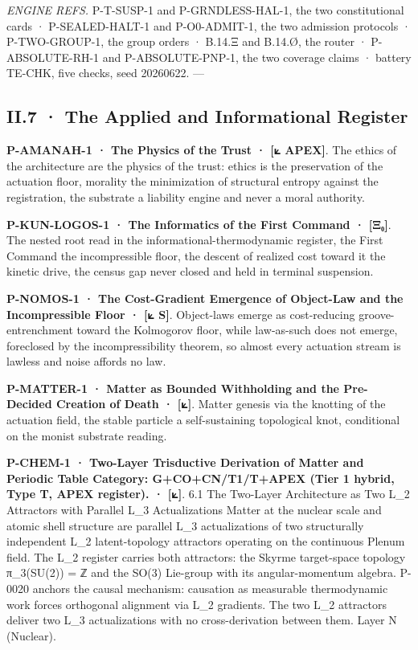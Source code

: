 \documentclass[10pt,twocolumn]{article}
\begin{document}
\emph{ENGINE REFS.} P-T-SUSP-1 and P-GRNDLESS-HAL-1, the two
constitutional cards · P-SEALED-HALT-1 and P-O0-ADMIT-1, the two
admission protocols · P-TWO-GROUP-1, the group orders · B.14.Ξ and
B.14.Ø, the router · P-ABSOLUTE-RH-1 and P-ABSOLUTE-PNP-1, the two
coverage claims · battery TE-CHK, five checks, seed 20260622. ---

\hypertarget{ii.7-the-applied-and-informational-register}{%
\subsection{II.7 · The Applied and Informational
Register}\label{ii.7-the-applied-and-informational-register}}

\textbf{P-AMANAH-1 · The Physics of the Trust · {[}⟀ APEX{]}}. The
ethics of the architecture are the physics of the trust: ethics is the
preservation of the actuation floor, morality the minimization of
structural entropy against the registration, the substrate a liability
engine and never a moral authority.

\textbf{P-KUN-LOGOS-1 · The Informatics of the First Command ·
{[}Ξ₀{]}}. The nested root read in the informational-thermodynamic
register, the First Command the incompressible floor, the descent of
realized cost toward it the kinetic drive, the census gap never closed
and held in terminal suspension.

\textbf{P-NOMOS-1 · The Cost-Gradient Emergence of Object-Law and the
Incompressible Floor · {[}⟀ S{]}}. Object-laws emerge as cost-reducing
groove-entrenchment toward the Kolmogorov floor, while law-as-such does
not emerge, foreclosed by the incompressibility theorem, so almost every
actuation stream is lawless and noise affords no law.

\textbf{P-MATTER-1 · Matter as Bounded Withholding and the Pre-Decided
Creation of Death · {[}⟀{]}}. Matter genesis via the knotting of the
actuation field, the stable particle a self-sustaining topological knot,
conditional on the monist substrate reading.

\textbf{P-CHEM-1 · Two-Layer Trisductive Derivation of Matter and
Periodic Table Category: G+CO+CN/T1/T+APEX (Tier 1 hybrid, Type T, APEX
register). · {[}⟀{]}}. 6.1 The Two-Layer Architecture as Two L\_2
Attractors with Parallel L\_3 Actualizations Matter at the nuclear scale
and atomic shell structure are parallel L\_3 actualizations of two
structurally independent L\_2 latent-topology attractors operating on
the continuous Plenum field. The L\_2 register carries both attractors:
the Skyrme target-space topology π\_3(SU(2)) = ℤ and the SO(3) Lie-group
with its angular-momentum algebra. P-0020 anchors the causal mechanism:
causation as measurable thermodynamic work forces orthogonal alignment
via L\_2 gradients. The two L\_2 attractors deliver two L\_3
actualizations with no cross-derivation between them. Layer N (Nuclear).
\end{document}
